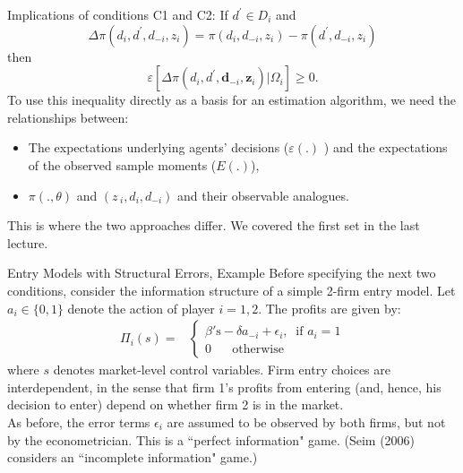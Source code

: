 \documentclass[xcolor=pdftex,dvipsnames,table,mathserif]{beamer}
\begin{document}
\begin{frame}{Implications of conditions C1 and C2:}
If $d^{\prime }\in D_{i}$ and 
\begin{equation*}
\Delta \pi (d_{i},d^{\prime },d_{-i},z_{i})=\pi (d_{i},d_{-i},z_{i})-\pi
(d^{\prime },d_{-i},z_{i})
\end{equation*}
then%
\begin{equation*}
\mathit{\varepsilon }\left[ \Delta \pi (d_{i},d^{\prime },\mathbf{d}_{-i},%
\mathbf{z}_{i})| \Omega_i \right] \geq 0.
\end{equation*}
To use this inequality directly as a basis for an estimation algorithm, we need the
relationships between:
\begin{itemize}
\item The expectations underlying agents' decisions ($\mathit{\varepsilon }(.)$%
) and the expectations of the observed sample moments ($E(.)$),
\item $\pi (.,\theta )$ and $(z\,_{i},d_{i},d_{-i})$ and their observable
analogues.
\end{itemize}
\vspace{0.2cm}
This is where the two approaches differ.  We covered the first set in the last lecture.
\end{frame}


\begin{frame}{Entry Models with Structural Errors, Example}
\small
Before specifying the next two conditions, consider the information structure of a simple 2-firm entry model. Let $a_i \in \{0,1 \}$ denote the action of player $i = 1,2$. The profits are given by:
\begin{equation*}
\begin{split}
\Pi_i (s) =& \left \{
\begin{array}{l} 
\beta' \text{s} - \delta a_{-i} + \epsilon_i , \;\; \text{if } a_i = 1 \\
0 \;\; \;\; \;\; \text{otherwise}
\end{array}
\right. 
\end{split}
\end{equation*}
where $s$ denotes market-level control variables. 
\vfill
Firm entry choices are interdependent, in the sense that firm 1's profits from entering (and, hence, his decision to enter) depend on whether firm 2 is in the market. \\
\vfill
As before, the error terms $\epsilon_i$ are assumed to be observed by both firms, but not by the econometrician. This is a ``perfect information" game. 
(Seim (2006) considers an ``incomplete information" game.)
\end{frame}
\end{document}
